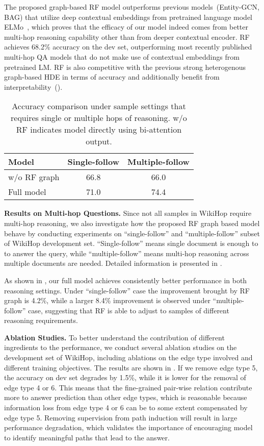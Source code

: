 The proposed graph-based RF model outperforms previous models~(Entity-GCN, BAG) that utilize deep contextual embeddings from pretrained language model ELMo~\cite{DBLP:journals/corr/abs-1802-05365}, which proves that the efficacy of our model indeed comes from better multi-hop reasoning capability other than from deeper contextual encoder. RF  achieves 68.2\% accuracy on the dev set, outperforming most recently published multi-hop QA models that do not make use of contextual embeddings from pretrained LM. RF is also competitive with the previous strong heterogenous graph-based HDE in terms of accuracy and additionally benefit from interpretability~().
\begin{table}[t]
	\centering
	\small
	\renewcommand\tabcolsep{4.0pt}
	\begin{tabular}{l|c c}
	\toprule
  \textbf{Model} &Single-follow &Multiple-follow \\
  \midrule
  w/o RF graph &66.8 &66.0 \\
  Full model &71.0 &74.4 \\
  \bottomrule
	\end{tabular}
\caption{Accuracy comparison under sample settings that requires single or multiple hops of reasoning. w/o RF indicates model directly using bi-attention output.}
\label{tab:follow}
\end{table}

\noindent
\textbf{Results on Multi-hop Questions. }
Since not all samples in WikiHop require multi-hop reasoning, we also investigate how the proposed RF graph based model behave by conducting experiments on ``single-follow'' and ``multiple-follow'' subset of WikiHop development set. ``Single-follow'' means single document is enough to to answer the query, while ``multiple-follow'' means multi-hop reasoning across multiple documents are needed. Detailed information is presented in \cite{Welbl2018}.

As shown in , our full model achieves consistently better performance in both reasoning settings. Under ``single-follow'' case the improvement brought by RF graph is 4.2\%, while a larger 8.4\% improvement is observed under ``multiple-follow'' case, suggesting that RF is able to adjust to samples of different reasoning requirements.

\noindent
\textbf{Ablation Studies. }
To better understand the contribution of different ingredients to the performance, we conduct several ablation studies on the development set of WikiHop, including ablations on the edge type involved and different training objectives. The results are shown in . If we remove edge type 5, the accuracy on dev set degrades by 1.5\%, while it is lower for the removal of edge type 4 or 6. This means that the fine-grained pair-wise relation contribute more to answer prediction than other edge types, which is reasonable because information loss from edge type 4 or 6 can be to some extent compensated by edge type 5. Removing supervision from path induction will result in large performance degradation, which validates the importance of encouraging model to identify meaningful paths that lead to the answer.

